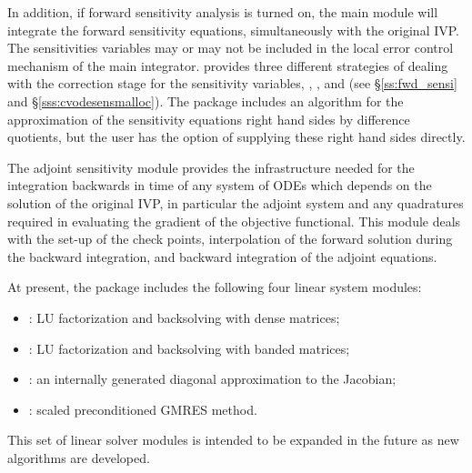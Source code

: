 In addition, if forward sensitivity analysis is turned on, the main module 
will integrate the forward sensitivity equations, simultaneously with the original IVP.
The sensitivities variables may or may not be included in the local error control
mechanism of the main integrator.
{\cvodes} provides three different strategies of dealing with the correction
stage for the sensitivity variables, , , and
 (see \S\ref{ss:fwd_sensi} and \S\ref{sss:cvodesensmalloc}).
The {\cvodes} package includes an algorithm for the approximation of the sensitivity 
equations right hand sides by difference quotients, but the user has the option of 
supplying these right hand sides directly.

The adjoint sensitivity module provides the infrastructure needed for the 
integration backwards in time of any system of ODEs which depends on the solution 
of the original IVP, in particular the adjoint system and any quadratures required
in evaluating the gradient of the objective functional.
This module deals with the set-up of the check points, interpolation of the forward 
solution during the backward integration, and backward integration of the adjoint
equations. 


At present, the package includes the following four {\cvodes} linear system
modules:
\begin{itemize} 
\item {\cvdense}: LU factorization and backsolving with dense matrices; 
\item {\cvband}: LU factorization and backsolving with banded matrices; 
\item {\cvdiag}: an internally generated diagonal approximation to the 
Jacobian; 
\item {\cvspgmr}: scaled preconditioned GMRES method.
\end{itemize}
This set of linear solver modules is intended to be expanded in the
future as new algorithms are developed.

